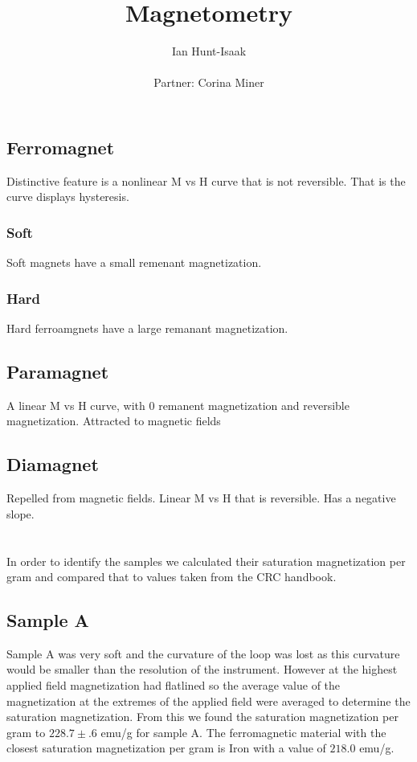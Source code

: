 \documentclass[11pt,letterpaper]{article}
\title{Magnetometry}
\author{Ian Hunt-Isaak\\ \begin{small}
Partner: Corina Miner
\end{small}}
\begin{document}
\date{}
\maketitle
\section{} %
\subsection{Ferromagnet}
Distinctive feature is a nonlinear M vs H curve that is not reversible. That is the curve displays hysteresis.
\subsubsection{Soft}
Soft magnets have a small remenant magnetization.
\subsubsection{Hard}
Hard ferroamgnets have a large remanant magnetization.
\subsection{Paramagnet}
A linear M vs H curve, with 0 remanent magnetization and reversible magnetization. Attracted to magnetic fields
\subsection{Diamagnet}
Repelled from magnetic fields. Linear M vs H that is reversible. Has a negative slope.
\section{} %
In order to identify the samples we calculated their saturation magnetization per gram and compared that to values taken from the CRC handbook.
\subsection{Sample A}
Sample A was very soft and the curvature of the loop was lost as this curvature would be smaller than the resolution of the instrument. However at the highest applied field magnetization had flatlined so the average value of the magnetization at the extremes of the applied field were averaged to determine the saturation magnetization. From this we found the saturation magnetization per gram to $228.7\pm .6$ emu/g for sample A. The ferromagnetic material with the closest saturation magnetization per gram is Iron with a value of  $218.0$ emu/g.
\end{document}
